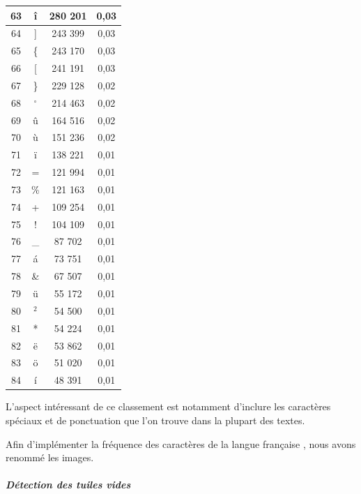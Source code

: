 \documentclass[a4paper,12pt,titlepage]{report}
\begin{document}
\begin{table}
\begin{tabular}{|c|c|c|c|}
\hline
63 & î & 	280 201 & 0,03 \\
\hline
64 & ] &	243 399 & 0,03 \\
\hline
65 &\{ &	243 170 & 0,03 \\
\hline
66 & [ &	241 191 & 0,03 \\
\hline
67 &\} &	229 128 & 0,02 \\
\hline
68 &$^\circ$&214 463& 0,02 \\
\hline
69 & û &    164 516 & 0,02 \\
\hline
70 & ù &	151 236 & 0,02 \\
\hline
71 & ï &	138 221 & 0,01 \\
\hline
72 & = &	121 994 & 0,01 \\
\hline
73 &\% &	121 163 & 0,01 \\
\hline
74 & + &	109 254 & 0,01 \\
\hline
75 & ! &	104 109 & 0,01 \\
\hline
76 &\_ &	 87 702 & 0,01 \\
\hline
77 & á &	 73 751 & 0,01 \\
\hline
78 &\& &	 67 507 & 0,01 \\
\hline
79 & ü & 	 55 172 & 0,01 \\
\hline
80 &$^2$& 	 54 500 & 0,01 \\
\hline
81 & * &	 54 224 & 0,01 \\
\hline
82 & ë & 	 53 862 & 0,01 \\
\hline
83 & ö & 	 51 020 & 0,01 \\
\hline
84 & í &	 48 391 & 0,01 \\ 
\hline
\end{tabular}
\label{freq_carac}
\end{table}	

L'aspect intéressant de ce classement est notamment d'inclure les caractères spéciaux et de ponctuation que l'on trouve dans la plupart des textes. 

Afin d'implémenter la fréquence des caractères de la langue française , nous avons renommé les images.
\subparagraph{Détection des tuiles vides}
\end{document}
